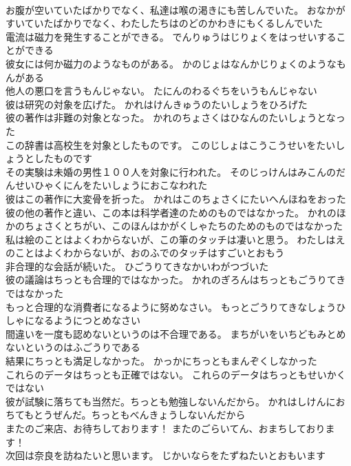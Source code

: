 \documentclass[8pt]{extreport}
\begin{document}
\begin{CJK}{UTF8}{min}
\\	お腹が空いていたばかりでなく、私達は喉の渇きにも苦しんでいた。	おなかがすいていたばかりでなく、わたしたちはのどのかわきにもくるしんでいた 
\\	電流は磁力を発生することができる。	でんりゅうはじりょくをはっせいすることができる 
\\	彼女には何か磁力のようなものがある。	かのじょはなんかじりょくのようなもんがある 
\\	他人の悪口を言うもんじゃない。	たにんのわるぐちをいうもんじゃない 
\\	彼は研究の対象を広げた。	かれはけんきゅうのたいしょうをひろげた 
\\	彼の著作は非難の対象となった。	かれのちょさくはひなんのたいしょうとなった 
\\	この辞書は高校生を対象としたものです。	このじしょはこうこうせいをたいしょうとしたものです 
\\	その実験は未婚の男性１００人を対象に行われた。	そのじっけんはみこんのだんせいひゃくにんをたいしょうにおこなわれた 
\\	彼はこの著作に大変骨を折った。	かれはこのちょさくにたいへんほねをおった 
\\	彼の他の著作と違い、この本は科学者達のためのものではなかった。	かれのほかのちょさくとちがい、このほんはかがくしゃたちのためのものではなかった 
\\	私は絵のことはよくわからないが、この筆のタッチは凄いと思う。	わたしはえのことはよくわからないが、おのふでのタッチはすごいとおもう 
\\	非合理的な会話が続いた。	ひごうりてきなかいわがつづいた 
\\	彼の議論はちっとも合理的ではなかった。	かれのぎろんはちっともごうりてきではなかった 
\\	もっと合理的な消費者になるように努めなさい。	もっとごうりてきなしょうひしゃになるようにつとめなさい 
\\	間違いを一度も認めないというのは不合理である。	まちがいをいちどもみとめないというのはふごうりである 
\\	結果にちっとも満足しなかった。	かっかにちっともまんぞくしなかった 
\\	これらのデータはちっとも正確ではない。	これらのデータはちっともせいかくではない 
\\	彼が試験に落ちても当然だ。ちっとも勉強しないんだから。	かれはしけんにおちてもとうぜんだ。ちっともべんきょうしないんだから 
\\	またのご来店、お待ちしております！	またのごらいてん、おまちしております！ 
\\	次回は奈良を訪ねたいと思います。	じかいならをたずねたいとおもいます 

\end{CJK}
\end{document}
